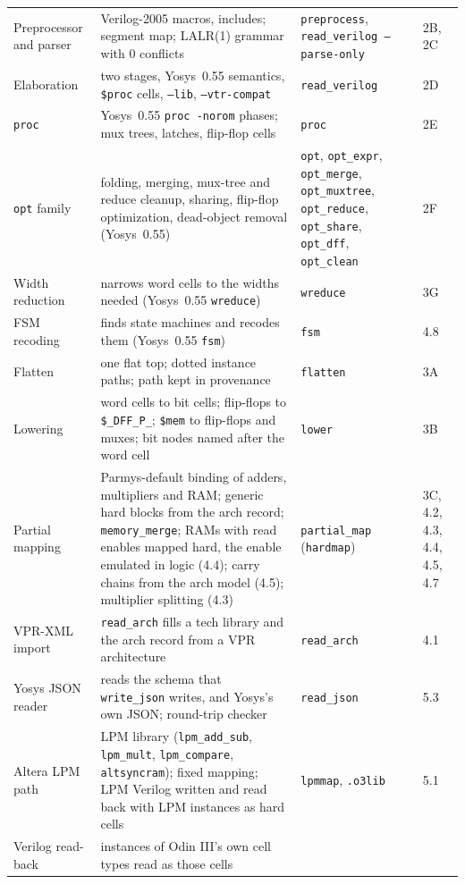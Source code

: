 \documentclass[conference]{IEEEtran}
\newcommand{\code}[1]{\texttt{#1}}
\begin{document}
\begin{table}[!tp]
\begin{tabular}{@{}>{\raggedright\arraybackslash}p{}%
  >{\raggedright\arraybackslash}p{}%
  >{\raggedright\arraybackslash}p{}p{}@{}}
Preprocessor and parser & Verilog-2005 macros, includes; segment map; LALR(1) grammar with 0
  conflicts & \code{preprocess}, \code{read\_verilog --parse-only} & 2B, 2C \\
Elaboration & two stages, Yosys~0.55 semantics, \code{\$proc} cells, \code{--lib}, \code{--vtr-compat}
  & \code{read\_verilog} & 2D \\
\code{proc} & Yosys~0.55 \code{proc -norom} phases; mux trees, latches, flip-flop cells
  & \code{proc} & 2E \\
\code{opt} family & folding, merging, mux-tree and reduce cleanup, sharing, flip-flop
  optimization, dead-object removal (Yosys~0.55) & \code{opt}, \code{opt\_expr}, \code{opt\_merge},
  \code{opt\_muxtree}, \code{opt\_reduce}, \code{opt\_share}, \code{opt\_dff}, \code{opt\_clean}
  & 2F \\
Width reduction & narrows word cells to the widths needed (Yosys~0.55 \code{wreduce}) &
  \code{wreduce} & 3G \\
FSM recoding & finds state machines and recodes them (Yosys~0.55 \code{fsm}) & \code{fsm} & 4.8 \\
Flatten & one flat top; dotted instance paths; path kept in provenance & \code{flatten} & 3A \\
Lowering & word cells to bit cells; flip-flops to \code{\$\_DFF\_P\_}; \code{\$mem} to flip-flops
  and muxes; bit nodes named after the word cell & \code{lower} & 3B \\
Partial mapping & Parmys-default binding of adders, multipliers and RAM; generic hard blocks from
  the arch record; \code{memory\_merge}; RAMs with read enables mapped hard, the enable emulated in
  logic (4.4); carry chains from the arch model (4.5); multiplier splitting (4.3) & \code{partial\_map} (\code{hardmap}) & 3C,
  4.2, 4.3, 4.4, 4.5, 4.7 \\
VPR-XML import & \code{read\_arch} fills a tech library and the arch record from a VPR architecture
  & \code{read\_arch} & 4.1 \\
Yosys JSON reader & reads the schema that \code{write\_json} writes, and Yosys's own JSON;
  round-trip checker & \code{read\_json} & 5.3 \\
Altera LPM path & LPM library (\code{lpm\_add\_sub}, \code{lpm\_mult}, \code{lpm\_compare},
  \code{altsyncram}); fixed mapping; LPM Verilog written and read back with LPM instances as hard
  cells & \code{lpmmap}, \code{.o3lib} & 5.1 \\
Verilog read-back & instances of Odin III's own cell types read as those cells &

\end{tabular}
\end{table}
\end{document}
